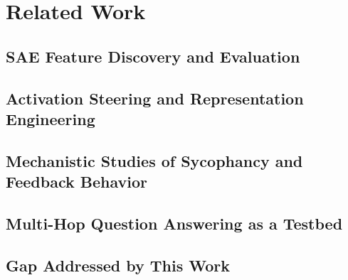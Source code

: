 \chapter{Related Work}

\section{SAE Feature Discovery and Evaluation}
\section{Activation Steering and Representation Engineering}
\section{Mechanistic Studies of Sycophancy and Feedback Behavior}
\section{Multi-Hop Question Answering as a Testbed}
\section{Gap Addressed by This Work}
